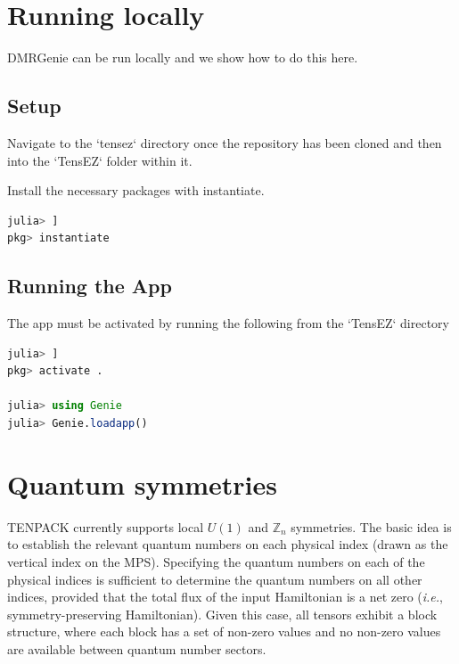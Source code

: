 \documentclass{juliacon}
\begin{document}
\begin{appendix}


\section{Running locally}

DMRGenie can be run locally and we show how to do this here.

\subsection{Setup}

Navigate to the `tensez` directory once the repository has been cloned and then into the `TensEZ` folder within it.

Install the necessary packages with instantiate.

\begin{lstlisting}[language = Julia]
julia> ] 
pkg> instantiate
\end{lstlisting}

\subsection{Running the App}

The app must be activated by running the following from the `TensEZ` directory

\begin{lstlisting}[language = Julia]
julia> ] 
pkg> activate .

julia> using Genie
julia> Genie.loadapp()
\end{lstlisting}

\section{Quantum symmetries}
\label{qsymmetries}

TENPACK currently supports local $U(1)$ and $\mathbb{Z}_n$ symmetries. The basic idea is to establish the relevant quantum numbers on each physical index (drawn as the vertical index on the MPS). Specifying the quantum numbers on each of the physical indices is sufficient to determine the quantum numbers on all other indices, provided that the total flux of the input Hamiltonian is a net zero ({\it i.e.}, symmetry-preserving Hamiltonian). Given this case, all tensors exhibit a block structure, where each block has a set of non-zero values and no non-zero values are available between quantum number sectors.


\end{appendix}
\end{document}
